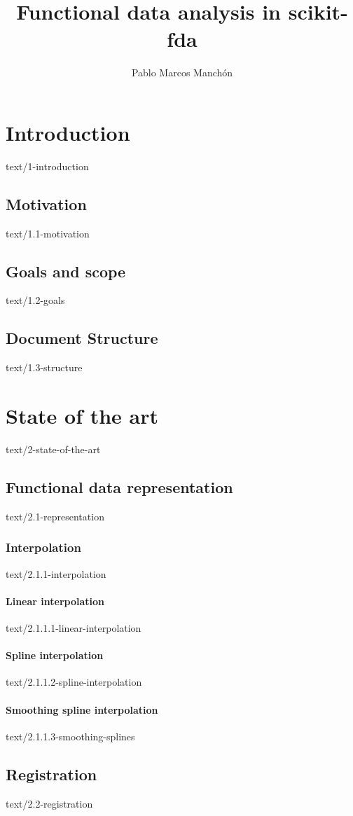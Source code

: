 \documentclass[epsbased,copyleft,final,printable,covers,extendedindex,firstnumbered,tfg, english]{tfgtfmthesisuam}
\author{Pablo Marcos Manchón}
\title[Functional data analysis: interpolation, registration and nearest neighbors in scikit-fda]{Functional data analysis in scikit-fda}
\subtitle{}
\begin{document}
\chapter{Introduction\label{CAP:INTRODUCTION}}{text/1-introduction}
  \section{Motivation\label{SEC:MOTIVATION}}{text/1.1-motivation}
  \section{Goals and scope\label{SEC:GOALS}}{text/1.2-goals}
  \section{Document Structure\label{SEC:STRUCTURE}}{text/1.3-structure}


\chapter{State of the art\label{CAP:STATEOFART}}{text/2-state-of-the-art}

  \section{Functional data representation\label{SEC:REPRESENTATION}}{text/2.1-representation}
    \subsection{Interpolation\label{SEC:INTERPOLATION}}{text/2.1.1-interpolation}
      \subsubsection{Linear interpolation\label{SSEC:LINEAR}}{text/2.1.1.1-linear-interpolation}
      \subsubsection{Spline interpolation\label{SSEC:SPLINES}}{text/2.1.1.2-spline-interpolation}
      \subsubsection{Smoothing spline interpolation\label{SSEC:SSPLINES}}{text/2.1.1.3-smoothing-splines}

  \section{Registration\label{SEC:REGISTRATION}}{text/2.2-registration}
\end{document}
